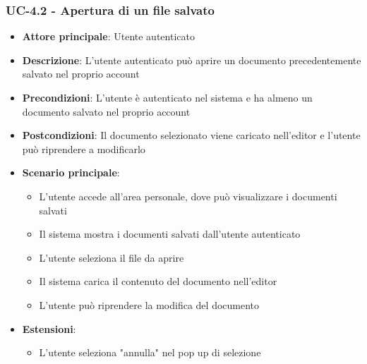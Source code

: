 \documentclass[11pt,a4paper]{article}
\begin{document}
\subsubsection{UC-4.2 - Apertura di un file salvato}
\begin{itemize}
    \item \textbf{Attore principale}: Utente autenticato
    \item \textbf{Descrizione}: L'utente autenticato può aprire un documento precedentemente salvato nel proprio account
    \item \textbf{Precondizioni}: L'utente è autenticato nel sistema e ha almeno un documento salvato nel proprio account
    \item \textbf{Postcondizioni}: Il documento selezionato viene caricato 
    nell'editor e l'utente può riprendere a modificarlo
    \item \textbf{Scenario principale}:
        \begin{itemize}
            \item L'utente accede all'area personale, dove può visualizzare i documenti salvati
            \item Il sistema mostra i documenti salvati dall'utente autenticato
            \item L'utente seleziona il file da aprire
            \item Il sistema carica il contenuto del documento nell'editor
            \item L'utente può riprendere la modifica del documento
        \end{itemize}
    \item \textbf{Estensioni}:
        \begin{itemize}
            \item L'utente seleziona "annulla" nel pop up di selezione
        \end{itemize}
\end{itemize}
\end{document}

